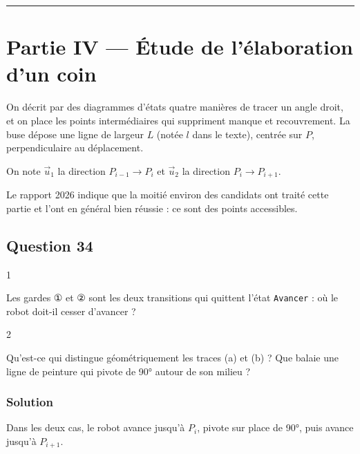 \documentclass[11pt,a4paper]{article}
\begin{document}
\begin{center}\rule{0.5\linewidth}{0.5pt}\end{center}

\hypertarget{partie-iv-uxe9tude-de-luxe9laboration-dun-coin}{%
\section{Partie IV --- Étude de l'élaboration d'un coin}\label{partie-iv-uxe9tude-de-luxe9laboration-dun-coin}}

On décrit par des diagrammes d'états quatre manières de tracer un angle droit, et on place les points intermédiaires qui suppriment manque et recouvrement. La buse dépose une ligne de largeur \(L\) (notée \(l\) dans le texte), centrée sur \(P\), perpendiculaire au déplacement.

On note \(\vec u_1\) la direction \(P_{i-1}\to P_i\) et \(\vec u_2\) la direction \(P_i\to P_{i+1}\).

Le rapport 2026 indique que la moitié environ des candidats ont traité cette partie et l'ont en général bien réussie : ce sont des points accessibles.

\hypertarget{question-34}{%
\subsection{Question 34}\label{question-34}}

\begin{indication}{1}

Les gardes ① et ② sont les deux transitions qui quittent l'état \texttt{Avancer} : où le robot doit-il cesser d'avancer ?

\end{indication}

\begin{indication}{2}

Qu'est-ce qui distingue géométriquement les traces (a) et (b) ? Que balaie une ligne de peinture qui pivote de 90° autour de son milieu ?

\end{indication}

\hypertarget{solution-33}{%
\subsubsection{Solution}\label{solution-33}}

Dans les deux cas, le robot avance jusqu'à \(P_i\), pivote sur place de 90°, puis avance jusqu'à \(P_{i+1}\).
\end{document}
